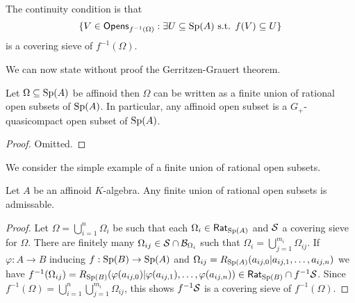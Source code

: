 \begin{remark}
    The continuity condition is that 
    $$\{V\in\mathsf{Opens}_{f^{-1}(\Omega)}:\exists U\subseteq \mathrm{Sp}(A)\text{ s.t. }f(V)\subseteq U\}$$ 
    is a covering sieve of $f^{-1}(\Omega)$. 
\end{remark}
We can now state without proof the Gerritzen-Grauert theorem. 
\begin{theorem}\label{thm: GG thm}
    Let $\Omega\subseteq\mathrm{Sp}(A)$ be affinoid then $\Omega$ can be written as a finite union of rational open subsets of $\mathrm{Sp}(A)$. In particular, any affinoid open subset is a $G_{+}$-quasicompact open subset of $\mathrm{Sp}(A)$.
\end{theorem}
\begin{proof}
    Omitted. 
\end{proof}
We consider the simple example of a finite union of rational open subsets. 
\begin{proposition}\label{prop: finite union of rationals is admissable}
    Let $A$ be an affinoid $K$-algebra. Any finite union of rational open subsets is admissable. 
\end{proposition}
\begin{proof}
    Let $\Omega=\bigcup_{i=1}^{n}\Omega_{i}$ be such that each $\Omega_{i}\in\mathsf{Rat}_{\mathrm{Sp}(A)}$ and $\mathcal{S}$ a covering sieve for $\Omega$. There are finitely many $\Omega_{ij}\in\mathcal{S}\cap\mathcal{B}_{\Omega_{i}}$ such that $\Omega_{i}=\bigcup_{j=1}^{m_{i}}\Omega_{ij}$. If $\varphi:A\to B$ inducing $f:\mathrm{Sp}(B)\to\mathrm{Sp}(A)$ and $\Omega_{ij}=R_{\mathrm{Sp}(A)}(a_{ij,0}|a_{ij,1},\dots,a_{ij,n})$ we have $f^{-1}(\Omega_{ij})=R_{\mathrm{Sp}(B)}(\varphi(a_{ij,0})|\varphi(a_{ij,1}),\dots,\varphi(a_{ij,n}))\in\mathsf{Rat}_{\mathrm{Sp}(B)}\cap f^{-1}\mathcal{S}$. Since $f^{-1}(\Omega)=\bigcup_{i=1}^{n}\bigcup_{j=1}^{m_{i}}\Omega_{ij}$, this shows $f^{-1}\mathcal{S}$ is a covering sieve of $f^{-1}(\Omega)$. 
\end{proof} %
